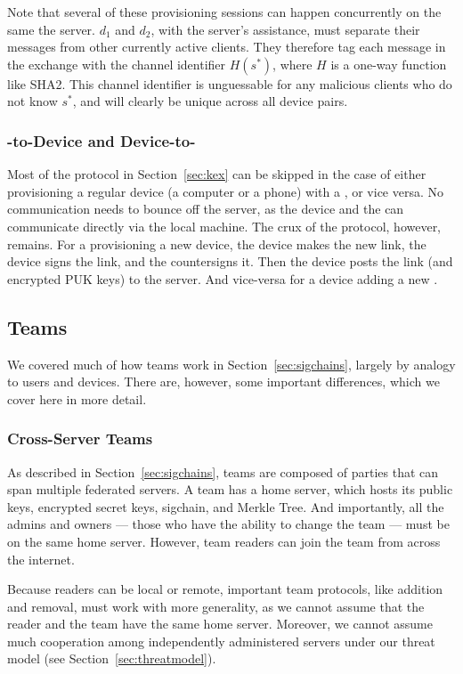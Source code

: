 Note that several of these provisioning sessions can happen concurrently on the
same the server. $d_1$ and $d_2$, with the server's assistance, must separate
their messages from other currently active clients.  They therefore tag each
message in the exchange with the channel identifier $H(s^{*})$, where $H$ is a
one-way function like SHA2. This channel identifier is unguessable for 
any malicious clients who do not know $s^{*}$, and will clearly be unique
across all device pairs.

\subsubsection{\Yubi -to-Device and Device-to-\Yubi }

Most of the protocol in Section~\ref{sec:kex} can be skipped in the case
of either provisioning a regular device (a computer or a phone) with a \yubi ,
or vice versa. No communication needs to bounce off the server, as the device
and the \yubi{} can communicate directly via the local machine. The crux of 
the protocol, however, remains. For a \yubi{} provisioning a new device,
the device makes the new link, the device signs the link, and the \yubi{} 
countersigns it. Then the device posts the link (and encrypted PUK keys)
to the server. And vice-versa for a device adding a new \yubi . 

\subsection{Teams}
\label{sec:teams}

We covered much of how teams work in Section~\ref{sec:sigchains}, largely by
analogy to users and devices. There are, however, some important differences,
which we cover here in more detail.

\subsubsection{Cross-Server Teams}

As described in Section~\ref{sec:sigchains}, teams are composed of parties
that can span multiple federated servers. A team has a home server, which 
hosts its public keys, encrypted secret keys, sigchain, and Merkle Tree.
And importantly, all the admins and owners --- those who have the ability
to change the team --- must be on the same home server. However, team readers
can join the team from across the internet.

Because readers can be local or remote, important team protocols, like addition
and removal, must work with more generality, as we cannot assume that the reader
and the team have the same home server. Moreover, we cannot assume much
cooperation among independently administered servers under our threat model
(see Section~\ref{sec:threatmodel}).

